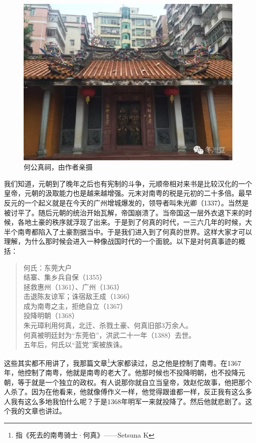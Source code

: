 \begin{figure}
	\centering
	\includegraphics[width=\textwidth]{images/image-43}
	\caption{何公真祠，由作者亲摄}
\end{figure}

我们知道，元朝到了晚年之后也有宪制的斗争，元顺帝相对来书是比较汉化的一个皇帝，元朝的汲取能力也是越来越增强。元末对南粤的税是元初的二十多倍。最早反元的一个起义就是在今天的广州增城爆发的，领导者叫朱光卿（1337）。当然是被讨平了。随后元朝的统治开始瓦解，帝国崩溃了。当帝国这一层外衣退下来的时候，各地土豪的秩序就浮现了出来。于是到了何真的时代，一三六几年的时候，大半个南粤都陷入了土豪割据当中。于是我们进入到了何真的世界。这样大家才可以理解，为什么那时候会进入一种像战国时代的一个面貌。以下是对何真事迹的概括：

\begin{quote}
何氏：东莞大户\\
结寨、集乡兵自保（1355）\\
拯救惠州（1361）、广州（1363）\\
击退陈友谅军；诛宿敌王成（1366）\\
成为南粤之主，拒绝自立（1367）\\
投降明朝（1368）\\
朱元璋利用何真，北迁、杀戮土豪、何真旧部3万余人。\\
何真被明廷封为“东莞伯”，洪武二十一年（1388）去世。\\
五年后，何氏以“蓝党”案被族诛。
\end{quote}

这些其实都不用讲了，我那篇文章\footnote{指《死去的南粤骑士·何真》——Setsuna K}大家都读过，总之他是控制了南粤。在1367年，他控制了南粤，他就是南粤的老大了。他那时候也不投降明朝，也不投降元朝，等于就是一个独立的政权。有人说那你就自立当皇帝，效赵佗故事，他把那个人杀了。因为在他看来，他就像傅作义一样，他觉得跟谁都一样，反正我有这么多人我有这么多地我怕什么呢？于是1368年明军一来就投降了。然后他就悲剧了。这个我的文章也讲过。

